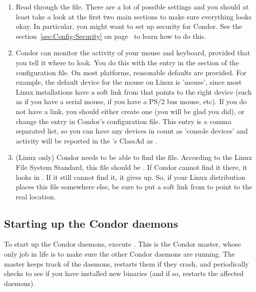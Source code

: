 \begin{enumerate}
\item Read through the  file.  There are a
    lot of possible settings and you should at least take a look at
    the first two main sections to make sure everything looks okay.
    In particular, you might want to set up security for
    Condor.  See the section~\ref{sec:Config-Security} on
    page~\pageref{sec:Config-Security} to learn how to do this.

\item Condor can monitor the activity of your mouse and keyboard,
    provided that you tell it where to look.  You do this with the
     entry in the  section of
    the configuration file.  On most platforms, reasonable
    defaults are provided.
    For example, the default device for the mouse on Linux
    is 'mouse', since most Linux installations have a soft link from
     that points to the right device (such as
     if you have a serial mouse,  if you have
    a PS/2 bus mouse, etc).  If you do not have a 
    link, you should either create one (you will be glad you did), or
    change the  entry in Condor's
    configuration file.
    This entry is a comma separated list, so you can have any
    devices in  count as 'console devices' and activity
    will be reported in the 's ClassAd as
    .

\item  (Linux only) Condor needs to be able to find the  file.
    According to the Linux File System Standard, this file should be
    .  If Condor cannot find it there, it looks in
    .  If it still cannot find it, it gives up.  So, if
    your Linux distribution places this file somewhere else, be sure to
    put a soft link from  to point to the real location.

\end{enumerate}

\subsection{Starting up the Condor daemons}

To start up the Condor daemons, execute
.  This is the Condor master, whose
only job in life is to make sure the other Condor daemons are running.
The master keeps track of the daemons, restarts them if they crash,
and periodically checks to see if you have installed new binaries (and
if so, restarts the affected daemons).

